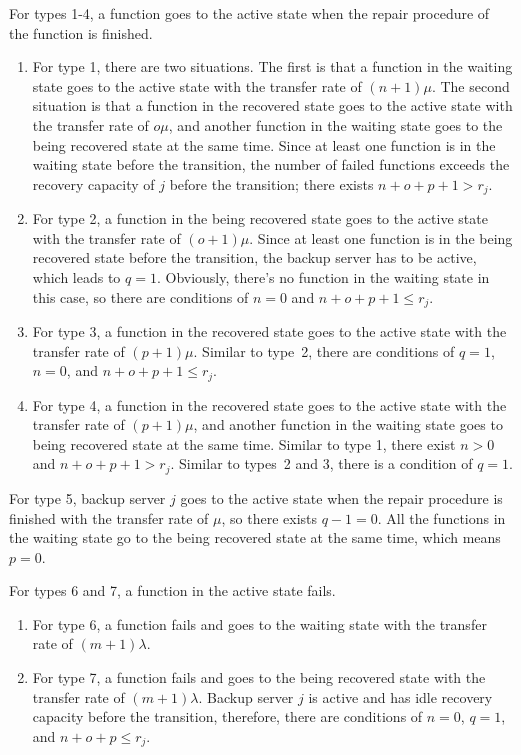 \documentclass[conference]{IEEEtran}
\begin{document}
For types 1-4, a function goes to the active state when the repair procedure of the function is finished.
\begin{enumerate}
\item For type 1, there are two situations. The first is that a function in the waiting state goes to the active state with the transfer rate of $(n+1)\mu$. The second situation is that a function in the recovered state goes to the active state with the transfer rate of $o\mu$, and another function in the waiting state goes to the being recovered state at the same time. Since at least one function is in the waiting state before the transition, the number of failed functions exceeds the recovery capacity of $j$ before the transition; there exists $n+o+p+1>r_j$.
\item For type 2, a function in the being recovered state goes to the active state with the transfer rate of $(o+1)\mu$. Since at least one function is in the being recovered state before the transition, the backup server has to be active, which leads to $q=1$. Obviously, there's no function in the waiting state in this case, so there are conditions of $n=0$ and $n+o+p+1 \le r_j$.
\item For type 3, a function in the recovered state goes to the active state with the transfer rate of $(p+1)\mu$. Similar to type~2, there are conditions of $q=1$, $n=0$, and $n+o+p+1 \le r_j$.
\item For type 4, a function in the recovered state goes to the active state with the transfer rate of $(p+1)\mu$, and another function in the waiting state goes to being recovered state at the same time. Similar to type 1, there exist $n>0$ and $n+o+p+1>r_j$. Similar to types~2 and 3, there is a condition of $q=1$.
\end{enumerate}

For type 5, backup server $j$ goes to the active state when the repair procedure is finished with the transfer rate of $\mu$, so there exists $q-1=0$. All the functions in the waiting state go to the being recovered state at the same time, which means $p=0$.

For types 6 and 7, a function in the active state fails.
\begin{enumerate}
    \item For type 6, a function fails and goes to the waiting state with the transfer rate of $(m+1)\lambda$.
    \item For type 7, a function fails and goes to the being recovered state with the transfer rate of $(m+1)\lambda$. Backup server $j$ is active and has idle recovery capacity before the transition, therefore, there are conditions of $n=0$, $q=1$, and $n+o+p \le r_j$.
\end{enumerate}
\end{document}
